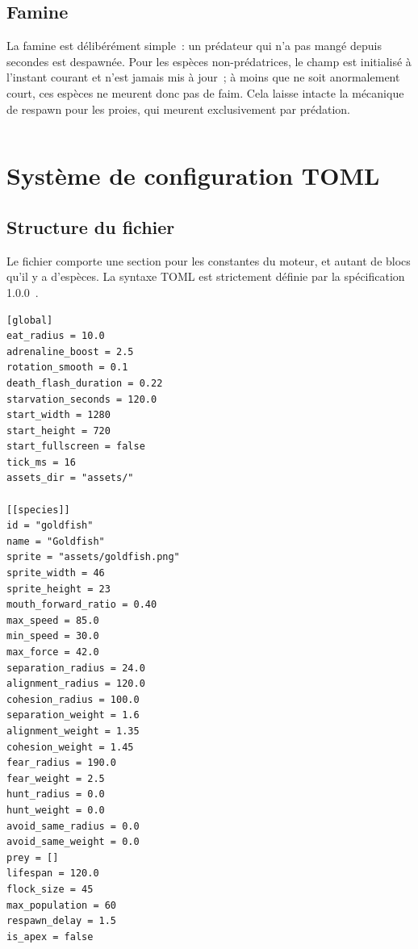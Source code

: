 \subsection{Famine}

La famine est délibérément simple~: un prédateur qui n'a pas
mangé depuis  secondes est despawnée.
Pour les espèces non-prédatrices, le champ  est
initialisé à l'instant courant et n'est jamais mis à jour~; à
moins que  ne soit anormalement
court, ces espèces ne meurent donc pas de faim. Cela laisse
intacte la mécanique de respawn pour les proies, qui meurent
exclusivement par prédation.

\begin{listing}[h!]
\inputminted[firstline=239, lastline=250]{c}{../src/world.c}
\caption{Vérification de la famine.}
\label{lst:lifespan}
\end{listing}

\section{Système de configuration TOML}

\subsection{Structure du fichier}

Le fichier  comporte une section
\code{[global]} pour les constantes du moteur, et autant de
blocs \code{[[species]]} qu'il y a d'espèces. La syntaxe TOML est
strictement définie par la spécification 1.0.0~\cite{tomlspec}.

\begin{listing}[h!]
\begin{verbatim}
[global]
eat_radius = 10.0
adrenaline_boost = 2.5
rotation_smooth = 0.1
death_flash_duration = 0.22
starvation_seconds = 120.0
start_width = 1280
start_height = 720
start_fullscreen = false
tick_ms = 16
assets_dir = "assets/"

[[species]]
id = "goldfish"
name = "Goldfish"
sprite = "assets/goldfish.png"
sprite_width = 46
sprite_height = 23
mouth_forward_ratio = 0.40
max_speed = 85.0
min_speed = 30.0
max_force = 42.0
separation_radius = 24.0
alignment_radius = 120.0
cohesion_radius = 100.0
separation_weight = 1.6
alignment_weight = 1.35
cohesion_weight = 1.45
fear_radius = 190.0
fear_weight = 2.5
hunt_radius = 0.0
hunt_weight = 0.0
avoid_same_radius = 0.0
avoid_same_weight = 0.0
prey = []
lifespan = 120.0
flock_size = 45
max_population = 60
respawn_delay = 1.5
is_apex = false
\end{verbatim}
\caption{Extrait de  : section globale et bloc .}
\label{lst:conf-extract}
\end{listing}

